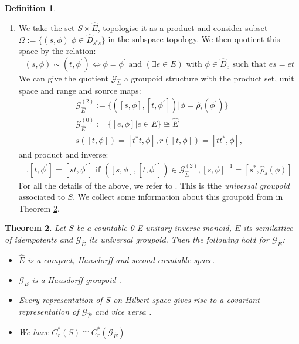 \documentclass[11pt]{amsart}
\theoremstyle{plain}
\newtheorem{theorem}{Theorem}%
\theoremstyle{definition}%
\newtheorem{definition}[theorem]{Definition}%
\theoremstyle{remark}%
\newcommand{\G}{\mathcal{G}}
\newcommand{\E}{\widehat{E}}
\begin{document}
\begin{definition}
\begin{enumerate}
\item We take the set $S \times \E$, topologise it as a product and consider subset $\Omega:= \lbrace (s, \phi) | \phi \in \widehat{D}_{s^{*}s} \rbrace$ in the subspace topology. We then quotient this space by the relation:
\begin{equation*}
(s, \phi) \sim (t, \phi^{'}) \Leftrightarrow \phi=\phi^{'} \mbox{ and } (\exists e \in E) \mbox{ with } \phi \in \widehat{D}_{e} \mbox{ such that } es=et
\end{equation*}
We can give the quotient $\G_{\E}$ a groupoid structure with the product set, unit space and range and source maps:
\begin{eqnarray*}
\G_{\E}^{(2)}:=\lbrace ([s,\phi],[t,\phi^{'}]) | \phi=\widehat{\rho}_{t}(\phi^{'}) \rbrace \\
\G_{\E}^{(0)}:= \lbrace [e,\phi] | e \in E \rbrace \cong \E \\
s([t,\phi])=[t^{*}t,\phi], r([t,\phi])=[tt^{*},\phi], 
\end{eqnarray*}
and product and inverse:
\begin{eqnarray*}
[s,\phi].[t,\phi^{'}]= [st,\phi^{'}] \mbox{ if } ([s,\phi],[t,\phi^{'}]) \in \G_{\E}^{(2)}, [s,\phi]^{-1} = [s^{*},\widehat{\rho}_{s}(\phi)] 
\end{eqnarray*}
For all the details of the above, we refer to \cite[Section 4]{MR2419901}. This is tthe \textit{universal groupoid} associated to $S$. We collect some information about this groupoid from \cite{MR2419901,MR1724106} in Theorem \ref{Thm:Info}.
\end{enumerate}
\end{definition}

\begin{theorem}\label{Thm:Info}
Let $S$ be a countable 0-E-unitary inverse monoid, $E$ its semilattice of idempotents and $\G_{\E}$ its universal groupoid. Then the following hold for $\G_{\E}$:
\begin{itemize}
\item $\E$ is a compact, Hausdorff and second countable space.
\item $\G_{\E}$ is a Hausdorff groupoid \cite[Corollary 10.9]{MR2419901}.
\item Every representation of $S$ on Hilbert space gives rise to a covariant representation of $\G_{\E}$ and vice versa \cite[Corollary 10.16]{MR2419901}.
\item We have $C^{*}_{r}(S) \cong C^{*}_{r}(\G_{\E})$ \cite{MR1724106,MR1900993}
\end{itemize}
\end{theorem}
\end{document}
